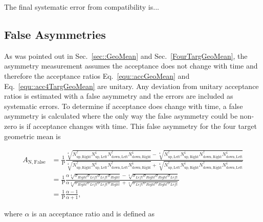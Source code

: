 \noindent
The final systematic error from compatibility is...

\subsection{False Asymmetries}
As was pointed out in Sec.~\ref{sec::GeoMean} and Sec.~\ref{FourTargGeoMean},
the asymmetry measurement assumes the acceptance does not change with time and
therefore the acceptance ratios Eq.~\ref{equ::accGeoMean} and
Eq.~\ref{equ::acc4TargGeoMean} are unitary.  Any deviation from unitary
acceptance ratios is estimated with a false asymmetry and the errors are
included as systematic errors.  To determine if acceptance does change with
time, a false asymmetry is calculated where the only way the false asymmetry
could be non-zero is if acceptance changes with time.  This false asymmetry for
the four target geometric mean is

\begin{equation}
  \label{eqn::falseAcc}
  \begin{split}
    A_{\mathrm{N,False}} &= 
    \frac{1}{\mathrm{P}}
    \frac{
      \sqrt[4]{
        N_{\mathrm{up,Right}}^{\uparrow}N_{\mathrm{up, Left}}^{\downarrow}
        N_{\mathrm{down,Left}}^{\uparrow}N_{\mathrm{down, Right}}^{\downarrow}
      } -
      \sqrt[4]{
        N_{\mathrm{up,Left}}^{\uparrow}N_{\mathrm{up, Right}}^{\downarrow}
        N_{\mathrm{down,Right}}^{\uparrow}N_{\mathrm{down, Left}}^{\downarrow}
      }
    }{
      \sqrt[4]{
        N_{\mathrm{up,Right}}^{\uparrow}N_{\mathrm{up, Left}}^{\downarrow}
        N_{\mathrm{down,Left}}^{\uparrow}N_{\mathrm{down, Right}}^{\downarrow}
      } +
      \sqrt[4]{
        N_{\mathrm{up,Left}}^{\uparrow}N_{\mathrm{up, Right}}^{\downarrow}
        N_{\mathrm{down,Right}}^{\uparrow}N_{\mathrm{down, Left}}^{\downarrow}
      }
    }\\
    & =
    \frac{1}{\mathrm{P}}
    \frac{
      \alpha \sqrt[4]{\sigma_{Right}\sigma_{Left}\sigma_{Left}\sigma_{Right}} -
      \sqrt[4]{\sigma_{Left}\sigma_{Right}\sigma_{Right}\sigma_{Left}}
    }{
      \alpha \sqrt[4]{\sigma_{Right}\sigma_{Left}\sigma_{Left}\sigma_{Right}} +
      \sqrt[4]{\sigma_{Left}\sigma_{Right}\sigma_{Right}\sigma_{Left}}
    }\\
    & =
    \frac{1}{\mathrm{P}}
    \frac{
      \alpha - 1     
    }{
      \alpha + 1
    },
  \end{split}
\end{equation}

\noindent
where $\alpha$ is an acceptance ratio and is defined as

